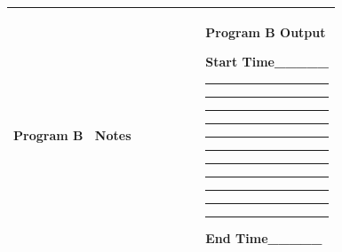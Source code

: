 \documentclass[]{article}
\begin{document}
\begin{longtable}[]{@{}ll@{}}
\toprule
\begin{minipage}[t]{0.47\columnwidth}\raggedright\strut
{Program B ~Notes ~~~~~~~~}
\strut\end{minipage} &
\begin{minipage}[t]{0.47\columnwidth}\raggedright\strut
{Program B Output}

{}

{}

{Start Time\_\_\_\_\_}

{}

\begin{center}\rule{0.5\linewidth}{\linethickness}\end{center}

{}

\begin{center}\rule{0.5\linewidth}{\linethickness}\end{center}

{}

\begin{center}\rule{0.5\linewidth}{\linethickness}\end{center}

{}

\begin{center}\rule{0.5\linewidth}{\linethickness}\end{center}

{}

\begin{center}\rule{0.5\linewidth}{\linethickness}\end{center}

{}

\begin{center}\rule{0.5\linewidth}{\linethickness}\end{center}

{}

\begin{center}\rule{0.5\linewidth}{\linethickness}\end{center}

{}

\begin{center}\rule{0.5\linewidth}{\linethickness}\end{center}

{}

\begin{center}\rule{0.5\linewidth}{\linethickness}\end{center}

{}

\begin{center}\rule{0.5\linewidth}{\linethickness}\end{center}

{}

\begin{center}\rule{0.5\linewidth}{\linethickness}\end{center}

{}

{}

{End Time\_\_\_\_\_}
\strut\end{minipage}\tabularnewline
\bottomrule
\end{longtable}
\end{document}
